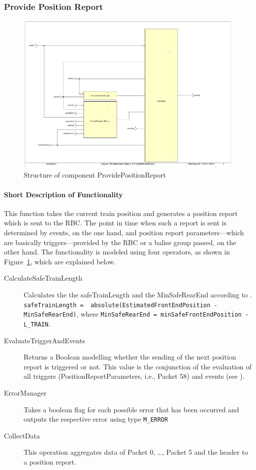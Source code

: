 \subsubsection{Provide Position Report}\label{sss:provposrep}

\begin{figure}
\centering
\includegraphics[width=\textwidth]{../images/ProvidePositionReport.pdf}
\caption{Structure of component ProvidePositionReport}\label{fig:provideposrep}
\end{figure}

\paragraph{Short Description of Functionality}
This function takes the current train position and generates a position report which is sent to the RBC. The point in time when such a report is sent is determined by events, on the one hand, and position report parameters---which are basically triggers---provided by the RBC or a balise group passed, on the other hand. The functionality is modeled using four operators, as shown in Figure~\ref{fig:provideposrep}, which are explained below.
\begin{description}
	\item[CalculateSafeTrainLength] Calculates the the safeTrainLength and the MinSafeRearEnd according to \cite[Chapter~3.6.5.2.4/5]{subset-026}. \\
\verb+safeTrainLength =  absolute(EstimatedFrontEndPosition - MinSafeRearEnd)+, where
\verb+MinSafeRearEnd = minSafeFrontEndPosition - L_TRAIN+.
	\item[EvaluateTriggerAndEvents] Returns a Boolean modelling whether the sending of the next position report is triggered or not. This value is the conjunction of the evaluation of all triggers (PositionReportParameters, i.e., Packet 58) and events (see \cite[Chapter~3.6.5.1.4]{subset-026}).
	\item[ErrorManager] Takes a boolean flag for each possible error that has been occurred and outputs the respective error using type \verb+M_ERROR+
	\item[CollectData] This operation aggregates data of Packet 0, \dots, Packet 5 and the header to a position report.
\end{description}

